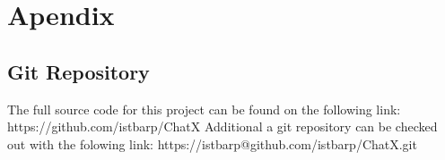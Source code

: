 \chapter*{Apendix}

\section*{Git Repository}

The full source code for this project can be found on the following link: 
\newline
\newline
https://github.com/istbarp/ChatX
\newline
\newline
\newline
Additional a git repository can be checked out with the folowing link:
\newline
\newline
https://istbarp@github.com/istbarp/ChatX.git
